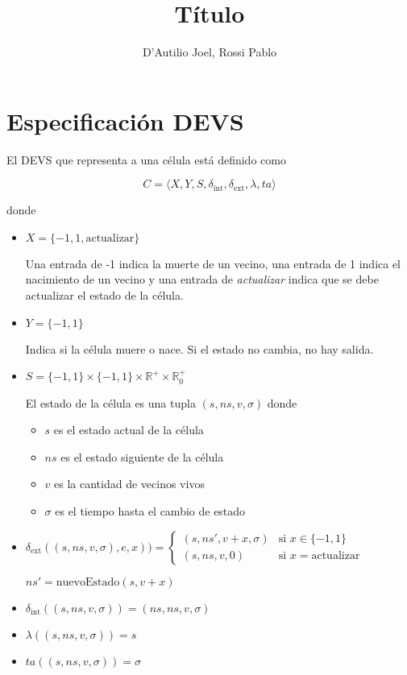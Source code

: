 \documentclass[12pt]{article}
\title{Título}
\author{D'Autilio Joel, Rossi Pablo}
\date{}
\newcommand{\dint}{\delta_{\text{int}}}
\newcommand{\dext}{\delta_{\text{ext}}}
\begin{document}
\maketitle

\section{Especificación DEVS}

El DEVS que representa a una célula está definido como

\[ C = \langle X, Y, S, \dint, \dext, \lambda, ta \rangle \]

donde
\begin{itemize}
  \item $X = \{-1, 1, \text{actualizar}\}$

    Una entrada de -1 indica la muerte de un vecino, una entrada de 1 indica el nacimiento de un vecino y una entrada de \textit{actualizar} indica que se debe actualizar el estado de la célula.

  \item $Y = \{-1,1\}$

    Indica si la célula muere o nace. Si el estado no cambia, no hay salida.

  \item $S = \{-1,1\} \times \{-1,1\} \times \mathbb{R}^+ \times \mathbb{R}_0^+$

    El estado de la célula es una tupla $(s, ns, v, \sigma)$ donde
    \begin{itemize}
      \item $s$ es el estado actual de la célula
      \item $ns$ es el estado siguiente de la célula
      \item $v$ es la cantidad de vecinos vivos
      \item $\sigma$ es el tiempo hasta el cambio de estado
    \end{itemize}

  \item $\dext((s, ns, v, \sigma), e, x)) = \begin{cases}
      (s, ns', v+x, \sigma) & \text{si } x \in \{-1,1\} \\
      (s, ns, v, 0) & \text{si } x = \text{actualizar}
    \end{cases}$

    $ns' = \text{nuevoEstado}(s, v+x)$

  \item $\dint((s, ns, v, \sigma)) = (ns, ns, v, \sigma)$

  \item $\lambda((s, ns, v, \sigma)) = s$

  \item $ta((s, ns, v, \sigma)) = \sigma$
\end{itemize}
\end{document}

